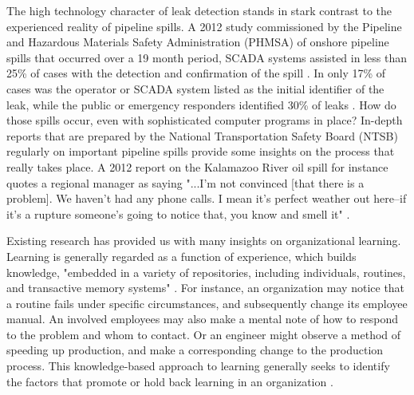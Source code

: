 \documentclass[12pt, man, natbib]{apa6}
\begin{document}
	The high technology character of leak detection stands in stark contrast to the experienced reality of pipeline spills. A 2012 study commissioned by the Pipeline and Hazardous Materials Safety Administration (PHMSA) of onshore pipeline spills that occurred over a 19 month period, SCADA systems assisted in less than 25\% of cases with the detection and confirmation of the spill \citep[p. 3-33]{Shaw2012}. In only 17\% of cases was the operator or SCADA system listed as the initial identifier of the leak, while the public or emergency responders identified 30\% of leaks \citep[p. 3-39]{Shaw2012}. How do those spills occur, even with sophisticated computer programs in place? In-depth reports that are prepared by the National Transportation Safety Board (NTSB) regularly on important pipeline spills provide some insights on the process that really takes place. A 2012 report on the Kalamazoo River oil spill for instance quotes a regional manager as saying "...I'm not convinced [that there is a problem]. We haven't had any phone calls. I mean it's perfect weather out here--if it's a rupture someone's going to notice that, you know and smell it" \citep[p. ]{NTSB2012}.
	
	Existing research has provided us with many insights on organizational learning. Learning is generally regarded as a function of experience, which builds knowledge, "embedded in a variety of repositories, including individuals, routines, and transactive memory systems" \citep[p. 1124]{Argote 2011}. For instance, an organization may notice that a routine fails under specific circumstances, and subsequently change its employee manual. An involved employees may also make a mental note of how to respond to the problem and whom to contact. Or an engineer might observe a method of speeding up production, and make a corresponding change to the production process. This knowledge-based approach to learning generally seeks to identify the factors that promote or hold back learning in an organization \citep[e.g.,][p. 2]{Argote2013-1}.
		
	
	
	
\end{document}
